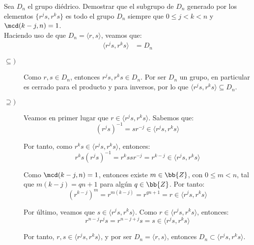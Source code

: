 \begin{ejercicio}\label{ej:3.2}
    Sea $D_n$ el grupo diédrico. Demostrar que el subgrupo de $D_n$ generado por los elementos $\{r^js, r^ks\}$ es todo el grupo $D_n$ siempre que $0 \leq j < k < n$ y $\mcd(k - j, n) = 1$.\\

    Haciendo uso de que $D_n = \langle r,s\rangle$, veamos que:
    \begin{align*}
        \langle r^js, r^ks\rangle &= D_n
    \end{align*}
    \begin{description}
        \item[$\subseteq)$] Como $r,s\in D_n$, entonces $r^js, r^ks\in D_n$. Por ser $D_n$ un grupo, en particular es cerrado para el producto y para inversos, por lo que $\langle r^js, r^ks\rangle\subseteq D_n$.
        
        \item[$\supseteq)$] Veamos en primer lugar que $r\in\langle r^js, r^ks\rangle$. Sabemos que:
        \begin{equation*}
            (r^js)^{-1} = sr^{-j}\in \langle r^js, r^ks\rangle
        \end{equation*}

        Por tanto, como $r^ks\in\langle r^js, r^ks\rangle$, entonces:
        \begin{equation*}
            r^ks(r^js)^{-1} = r^kssr^{-j} = r^{k-j}\in\langle r^js, r^ks\rangle
        \end{equation*}

        Como $\mcd(k-j,n)=1$, entonces existe $m\in\bb{Z}$, con $0\leq m<n$, tal que $m(k-j)=qn+1$ para algún $q\in\bb{Z}$. Por tanto:
        \begin{equation*}
            (r^{k-j})^m = r^{m(k-j)} = r^{qn+1} = r\in\langle r^js, r^ks\rangle
        \end{equation*}

        Por último, veamos que $s\in\langle r^js, r^ks\rangle$. Como $r\in\langle r^js, r^ks\rangle$, entonces:
        \begin{equation*}
            r^{n-j}r^js = r^{n-j+j}s = s\in\langle r^js, r^ks\rangle
        \end{equation*}

        Por tanto, $r,s\in\langle r^js, r^ks\rangle$, y por ser $D_n = \langle r,s\rangle$, entonces $D_n\subset \langle r^js, r^ks\rangle$.
    \end{description}
\end{ejercicio}

